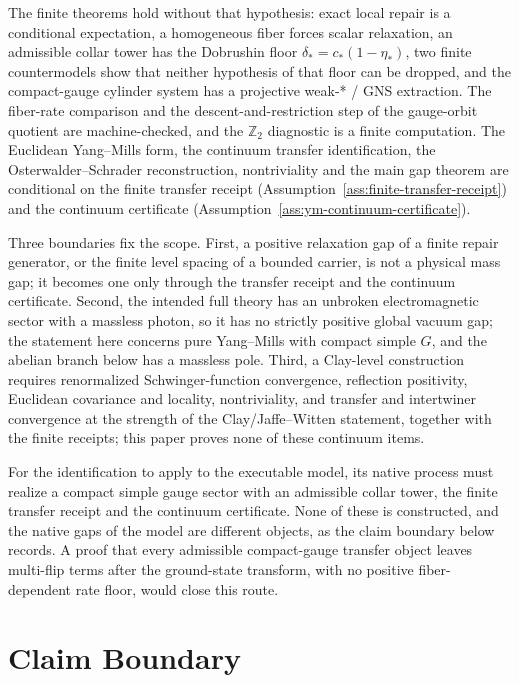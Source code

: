 \documentclass[11pt]{article}
\numberwithin{equation}{section}
\theoremstyle{remark}
\begin{document}
The finite theorems hold without that hypothesis: exact local repair is a
conditional expectation, a homogeneous fiber forces scalar relaxation, an
admissible collar tower has the Dobrushin floor
\(\delta_*=c_*(1-\eta_*)\), two finite countermodels show that neither
hypothesis of that floor can be dropped, and the compact-gauge cylinder
system has a projective weak-* / GNS extraction. The fiber-rate comparison
and the descent-and-restriction step of the gauge-orbit quotient are
machine-checked, and the \(\mathbb Z_2\) diagnostic is a finite computation.
The Euclidean Yang--Mills form, the continuum transfer identification, the
Osterwalder--Schrader reconstruction, nontriviality and the main gap theorem
are conditional on the finite transfer receipt
(Assumption~\ref{ass:finite-transfer-receipt}) and the continuum certificate
(Assumption~\ref{ass:ym-continuum-certificate}).

Three boundaries fix the scope. First, a positive relaxation gap of a finite
repair generator, or the finite level spacing of a bounded carrier, is not a
physical mass gap; it becomes one only through the transfer receipt and the
continuum certificate. Second, the intended full theory has an unbroken
electromagnetic sector with a massless photon, so it has no strictly
positive global vacuum gap; the statement here concerns pure Yang--Mills
with compact simple \(G\), and the abelian branch below has a massless
pole. Third, a Clay-level construction requires renormalized
Schwinger-function convergence, reflection positivity, Euclidean covariance
and locality, nontriviality, and transfer and intertwiner convergence at the
strength of the Clay/Jaffe--Witten statement, together with the finite
receipts; this paper proves none of these continuum items.

For the identification to apply to the executable model, its native process
must realize a compact simple gauge sector with an admissible collar tower,
the finite transfer receipt and the continuum certificate. None of these is
constructed, and the native gaps of the model are different objects, as
the claim boundary below records. A proof that every admissible
compact-gauge transfer object leaves multi-flip terms after the ground-state
transform, with no positive fiber-dependent rate floor, would close this
route.

\section{Claim Boundary}
\end{document}
